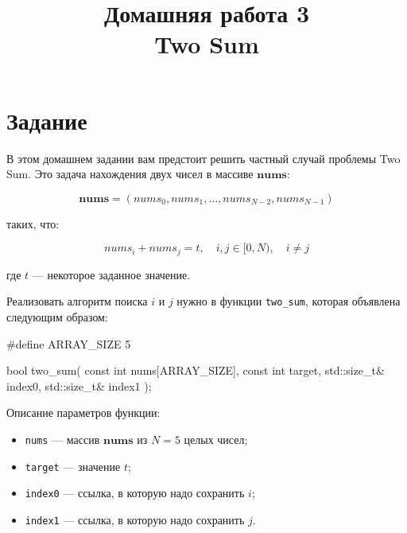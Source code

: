 \documentclass[14pt]{extarticle}
\title{Домашняя работа 3 \\ Two Sum}
\begin{document}
\maketitle

\tableofcontents

\section{Задание}

    В этом домашнем задании вам предстоит решить частный случай проблемы Two Sum.
    Это задача нахождения двух чисел в массиве $\mathbf{nums}$:

    \begin{equation}
\mathbf{nums} = (nums_0, nums_1, \dots , nums_{N-2}, nums_{N-1})
    \end{equation}

    таких, что:

    \begin{equation}
nums_i + nums_j = t, \quad i,j \in [0, N), \quad i \neq j
    \end{equation}

    где $t$ --- некоторое заданное значение.

    Реализовать алгоритм поиска $i$ и $j$ нужно в функции \verb|two_sum|,
    которая объявлена следующим образом:

    \begin{myinplacelisting}[minted language=cpp]
#define ARRAY_SIZE 5

bool two_sum(
    const int nums[ARRAY_SIZE],
    const int target,
    std::size_t& index0,
    std::size_t& index1
);
    \end{myinplacelisting}

    Описание параметров функции:

    \begin{itemize}

        \item \verb|nums| --- массив $\mathbf{nums}$ из $N = 5$ целых чисел;

        \item \verb|target| --- значение $t$;

        \item \verb|index0| --- ссылка, в которую надо сохранить $i$;

        \item \verb|index1| --- ссылка, в которую надо сохранить $j$.

    \end{itemize}
\end{document}
